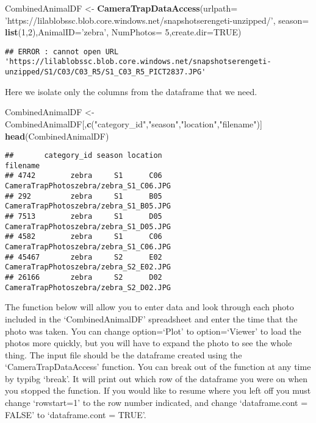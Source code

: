 \documentclass[]{book}
\newenvironment{Shaded}{\begin{snugshade}}{\end{snugshade}}
\newcommand{\DataTypeTok}[1]{\textcolor[rgb]{0.13,0.29,0.53}{#1}}
\newcommand{\DecValTok}[1]{\textcolor[rgb]{0.00,0.00,0.81}{#1}}
\newcommand{\KeywordTok}[1]{\textcolor[rgb]{0.13,0.29,0.53}{\textbf{#1}}}
\newcommand{\NormalTok}[1]{#1}
\newcommand{\OtherTok}[1]{\textcolor[rgb]{0.56,0.35,0.01}{#1}}
\newcommand{\StringTok}[1]{\textcolor[rgb]{0.31,0.60,0.02}{#1}}
\begin{document}
\begin{Shaded}
\begin{Highlighting}[]
\NormalTok{CombinedAnimalDF <-}\StringTok{ }\KeywordTok{CameraTrapDataAccess}\NormalTok{(}\DataTypeTok{urlpath=} \StringTok{'https://lilablobssc.blob.core.windows.net/snapshotserengeti-unzipped/'}\NormalTok{,}
                     \DataTypeTok{season=} \KeywordTok{list}\NormalTok{(}\DecValTok{1}\NormalTok{,}\DecValTok{2}\NormalTok{),}\DataTypeTok{AnimalID=}\StringTok{'zebra'}\NormalTok{, }\DataTypeTok{NumPhotos=} \DecValTok{5}\NormalTok{,}\DataTypeTok{create.dir=}\OtherTok{TRUE}\NormalTok{)}
\end{Highlighting}
\end{Shaded}

\begin{verbatim}
## ERROR : cannot open URL 'https://lilablobssc.blob.core.windows.net/snapshotserengeti-unzipped/S1/C03/C03_R5/S1_C03_R5_PICT2837.JPG'
\end{verbatim}

Here we isolate only the columns from the dataframe that we need.

\begin{Shaded}
\begin{Highlighting}[]
\NormalTok{CombinedAnimalDF <-}\StringTok{ }\NormalTok{CombinedAnimalDF[,}\KeywordTok{c}\NormalTok{(}\StringTok{"category_id"}\NormalTok{,}\StringTok{"season"}\NormalTok{,}\StringTok{"location"}\NormalTok{,}\StringTok{"filename"}\NormalTok{)]}
\KeywordTok{head}\NormalTok{(CombinedAnimalDF)}
\end{Highlighting}
\end{Shaded}

\begin{verbatim}
##       category_id season location                               filename
## 4742        zebra     S1      C06 CameraTrapPhotoszebra/zebra_S1_C06.JPG
## 292         zebra     S1      B05 CameraTrapPhotoszebra/zebra_S1_B05.JPG
## 7513        zebra     S1      D05 CameraTrapPhotoszebra/zebra_S1_D05.JPG
## 4582        zebra     S1      C06 CameraTrapPhotoszebra/zebra_S1_C06.JPG
## 45467       zebra     S2      E02 CameraTrapPhotoszebra/zebra_S2_E02.JPG
## 26166       zebra     S2      D02 CameraTrapPhotoszebra/zebra_S2_D02.JPG
\end{verbatim}

The function below will allow you to enter data and look through each photo included in the `CombinedAnimalDF' spreadsheet and enter the time that the photo was taken. You can change option=`Plot' to option=`Viewer' to load the photos more quickly, but you will have to expand the photo to see the whole thing. The input file should be the dataframe created using the `CameraTrapDataAccess' function. You can break out of the function at any time by typibg `break'. It will print out which row of the dataframe you were on when you stopped the function. If you would like to resume where you left off you must change `rowstart=1' to the row number indicated, and change `dataframe.cont = FALSE' to `dataframe.cont = TRUE'.
\end{document}
